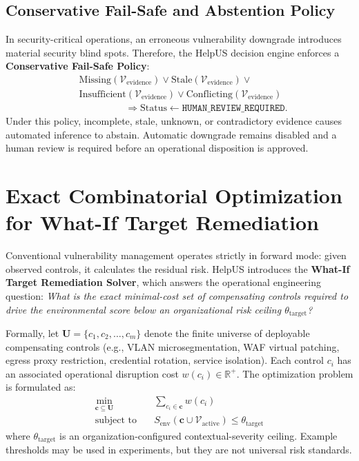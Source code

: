 \subsection{Conservative Fail-Safe and Abstention Policy}
In security-critical operations, an erroneous vulnerability downgrade introduces material security blind spots. Therefore, the HelpUS decision engine enforces a \textbf{Conservative Fail-Safe Policy}:
\begin{align}
    &\text{Missing}(\mathcal{V}_{\text{evidence}}) \lor \text{Stale}(\mathcal{V}_{\text{evidence}}) \lor \\
    &\text{Insufficient}(\mathcal{V}_{\text{evidence}}) \lor \text{Conflicting}(\mathcal{V}_{\text{evidence}}) \nonumber\\
    &\hspace{2cm}\Longrightarrow \text{Status} \gets \texttt{HUMAN\_REVIEW\_REQUIRED}.
\end{align}
Under this policy, incomplete, stale, unknown, or contradictory evidence causes automated inference to abstain. Automatic downgrade remains disabled and a human review is required before an operational disposition is approved.

\section{Exact Combinatorial Optimization for What-If Target Remediation}
\label{sec:whatif_optimizer}
Conventional vulnerability management operates strictly in forward mode: given observed controls, it calculates the residual risk. HelpUS introduces the \textbf{What-If Target Remediation Solver}, which answers the operational engineering question: \textit{What is the exact minimal-cost set of compensating controls required to drive the environmental score below an organizational risk ceiling $\theta_{\text{target}}$?}

Formally, let $\mathbf{U} = \{c_1, c_2, \dots, c_m\}$ denote the finite universe of deployable compensating controls (e.g., VLAN microsegmentation, WAF virtual patching, egress proxy restriction, credential rotation, service isolation). Each control $c_i$ has an associated operational disruption cost $w(c_i) \in \mathbb{R}^+$. The optimization problem is formulated as:
\begin{align}
    \min_{\mathbf{c} \subseteq \mathbf{U}} \quad & \sum_{c_i \in \mathbf{c}} w(c_i) \\
    \text{subject to} \quad & S_{\text{env}}(\mathbf{c} \cup \mathcal{V}_{\text{active}}) \le \theta_{\text{target}} \nonumber
\end{align}
where $\theta_{\text{target}}$ is an organization-configured contextual-severity ceiling. Example thresholds may be used in experiments, but they are not universal risk standards.

